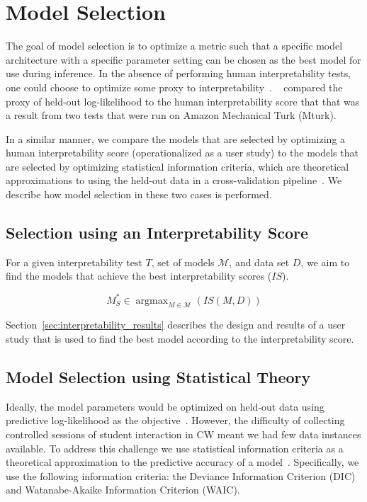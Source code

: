\documentclass[letterpaper]{article} %
\newcommand{\citename}[1]{\citeauthor{#1}~\shortcite{#1}}
\DeclareMathOperator{\argmax}{argmax}
\begin{document}
\section{Model Selection}
\label{sec:model_selection}
The goal of model selection is to optimize a metric such that a specific model architecture with a specific parameter setting can be chosen as the best model for use during inference.
In the absence of performing human interpretability tests, one could choose to optimize some proxy to interpretability~\cite{doshi2017roadmap,lage2018human}. \citename{chang2009reading} compared the proxy of held-out log-likelihood to the human interpretability score that that was a result from two tests that were run on Amazon Mechanical Turk (Mturk).

In a similar manner, we compare the models that are selected by optimizing a human interpretability score  (operationalized as a user  study) to the models that are selected by optimizing statistical information criteria, which are theoretical approximations to using the held-out data in a cross-validation pipeline~\cite{gelman2013bayesian}.
We describe how model selection in these two cases is performed.

\subsection{Selection using an Interpretability Score}

For a given interpretability test $T$,  set of models $\mathcal{M}$, and data set $D$, we aim to find the models that achieve the best interpretability scores ($IS$).

\begin{equation}
    \label{eq:model_int_score}
    M^*_S \in \argmax_{M \in \mathcal{M}}(IS(M, D))
\end{equation}

Section~\ref{sec:interpretability_results} describes the design and results of a  user study that is
used to find the best model according to the interpretability score.




\subsection{Model Selection using Statistical Theory}
\label{sec:baseline}

Ideally, the model parameters would be optimized on held-out data using predictive log-likelihood as the objective~\cite{chang2009reading}.
However, the difficulty of collecting controlled sessions of student interaction in CW meant we had few data instances available.
To address this challenge we use  statistical information criteria as a theoretical approximation to the predictive accuracy of a model~\cite{gelman2013bayesian}. Specifically, we use the following information criteria:
the {Deviance Information Criterion (DIC)} and {Watanabe-Akaike Information Criterion (WAIC)}.
\end{document}
